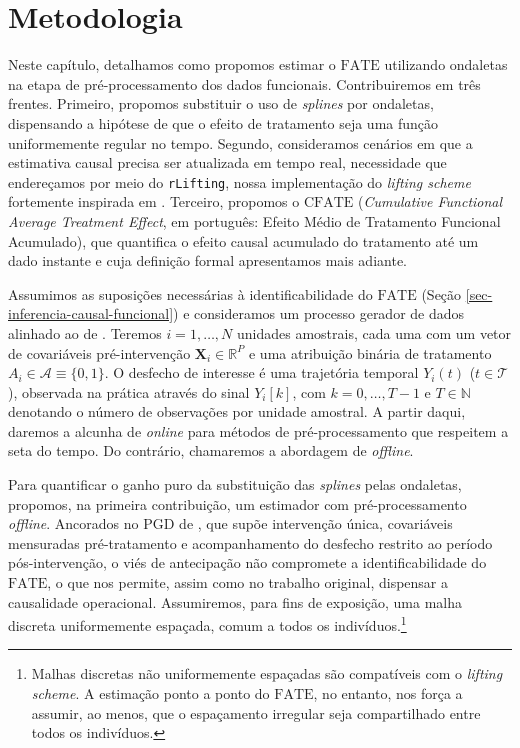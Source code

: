 \chapter[Metodologia]{Metodologia}\label{sec-metodologia}
Neste capítulo, detalhamos como propomos estimar o \(\mathrm{FATE}\) utilizando ondaletas na etapa de pré-processamento dos dados funcionais. 
Contribuiremos em três frentes. 
Primeiro, propomos substituir o uso de \emph{splines} por ondaletas, dispensando a hipótese de que o efeito de tratamento seja uma função uniformemente regular no tempo. 
Segundo, consideramos cenários em que a estimativa causal precisa ser atualizada em tempo real, necessidade que endereçamos por meio do \texttt{rLifting}, nossa implementação do \emph{lifting scheme} fortemente inspirada em . 
Terceiro, propomos o \(\mathrm{CFATE}\) (\emph{Cumulative Functional Average Treatment Effect}, em português: Efeito Médio de Tratamento Funcional Acumulado), que quantifica o efeito causal acumulado do tratamento até um dado instante e cuja definição formal apresentamos mais adiante.

Assumimos as suposições necessárias à identificabilidade do \(\mathrm{FATE}\) (Seção \ref{sec-inferencia-causal-funcional}) e consideramos um processo gerador de dados alinhado ao de . 
Teremos \(i = 1, \dots, N\) unidades amostrais, cada uma com um vetor de covariáveis pré-intervenção \(\mathbf{X}_i \in \mathbb{R}^{P}\) e uma atribuição binária de tratamento \(A_i \in \mathcal{A} \equiv \{0,1\}\). 
O desfecho de interesse é uma trajetória temporal \(Y_i(t)\) (\(t \in \mathcal{T}\)), observada na prática através do sinal \(Y_i[k]\), com \(k = 0, \dots, T-1\) e \(T \in \mathbb{N}\) denotando o número de observações por unidade amostral. 
A partir daqui, daremos a alcunha de \emph{online} para métodos de pré-processamento que respeitem a seta do tempo. Do contrário, chamaremos a abordagem de \emph{offline}.

Para quantificar o ganho puro da substituição das \emph{splines} pelas ondaletas, propomos, na primeira contribuição, um estimador com pré-processamento \emph{offline}. 
Ancorados no PGD de , que supõe intervenção única, covariáveis mensuradas pré-tratamento e acompanhamento do desfecho restrito ao período pós-intervenção, o viés de antecipação não compromete a identificabilidade do \(\mathrm{FATE}\), o que nos permite, assim como no trabalho original, dispensar a causalidade operacional.
Assumiremos, para fins de exposição, uma malha discreta uniformemente espaçada, comum a todos os indivíduos.\footnote{Malhas discretas não uniformemente espaçadas são compatíveis com o \emph{lifting scheme}. A estimação ponto a ponto do \(\mathrm{FATE}\), no entanto, nos força a assumir, ao menos, que o espaçamento irregular seja compartilhado entre todos os indivíduos.}

